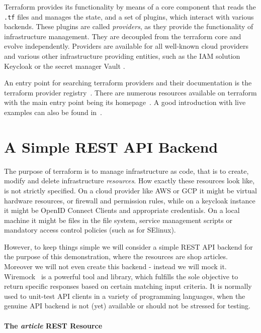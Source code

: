 \documentclass[paper=a4,11pt,numbers=noenddot]{article}
\begin{document}
Terraform provides its functionality by means of a core component that reads the \verb'.tf' files and manages the state, and a set of plugins, which interact with various backends. These plugins are called \emph{providers}, as they provide the functionality of infrastructure management. They are decoupled from the terraform core and evolve independently. Providers are available for all well-known cloud providers and various other infrastructure providing entities, such as the IAM solution Keycloak \cite{team_keycloak_nodate} or the secret manager Vault \cite{noauthor_vault_nodate}.

An entry point for searching terraform providers and their documentation is the terraform provider registry~\cite{noauthor_terraform_registry_nodate}. There are numerous resources available on terraform with the main entry point being its homepage~\cite{noauthor_terraform_nodate}. A good introduction with live examples can also be found in~\cite{brikman_terraform_2022}.


\section{A Simple REST API Backend}
\label{sec:simple-rest-api}

The purpose of terraform is to manage infrastructure as code, that is to create, modify and delete infrastructure \emph{resources}. How exactly these resources look like, is not strictly specified. On a cloud provider like AWS or GCP it might be virtual hardware resources, or firewall and permission rules, while on a keycloak instance it might be OpenID Connect Clients and appropriate credentials. On a local machine it might be files in the file system, service management scripts or mandatory access control policies (such as for SElinux).

However, to keep things simple we will consider a simple REST API backend for the purpose of this demonstration, where the resources are shop articles. Moreover we will not even create this backend - instead we will mock it. Wiremock~\cite{noauthor_wiremock_nodate} is a powerful tool and library, which fulfills the sole objective to return specific responses based on certain matching input criteria. It is normally used to unit-test API clients in a variety of programming languages, when the genuine API backend is not (yet) available or should not be stressed for testing.

\paragraph{The \emph{article} REST Resource}
\end{document}
